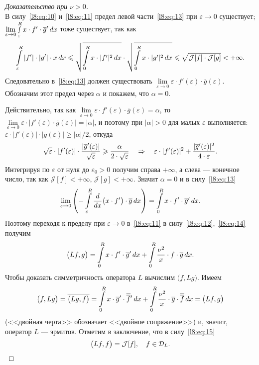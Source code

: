 \documentclass[12pt,a4paper,openany,fleqn]{book}
\newcommand{\J}{\ensuremath{\mathcal{J}}}
\newcommand{\mc}[1]{\ensuremath{\mathcal{#1}}}
\newcommand{\der}[2]{\ensuremath{\frac{d#1}{d#2}}}
\newcommand{\eps}{\varepsilon}
\theoremstyle{definition}
\begin{document}
\begin{proof}[Доказательство при $\nu>0$]
\begin{equation}
		\end{equation}
		В силу~\eqref{l8:eq:10} и~\eqref{l8:eq:11} предел левой части~\eqref{l8:eq:13} при $\eps\to0$ существует; $\lim\limits_{\eps\to0}\smallint\limits_{\eps}^R x\cdot f'\cdot\overline{g}'\,dx$ тоже существует, так как 
		\begin{equation*}
			\hfill\int\limits_{\eps}^{R}|f'|\cdot|g'|\cdot x\,dx\leqslant\sqrt{\int\limits_{0}^{R}x\cdot|f'|^2\,dx}\cdot\sqrt{\int\limits_{0}^{R}x\cdot|g'|^2\,dx}\leqslant\sqrt{\J[f]\cdot\J[g]}<+\infty.\hfill
		\end{equation*}
		Следовательно в~\eqref{l8:eq:13} должен существовать $\lim\limits_{\eps\to0}\eps\cdot f'(\eps)\cdot\overline{g}(\eps)$. Обозначим этот предел через $\alpha$ и покажем, что $\alpha=0$.
		
		Действительно, так как $\lim\limits_{\eps\to0}\eps\cdot f'(\eps)\cdot\overline{g}(\eps)=\alpha$, то $\lim\limits_{\eps\to0}\eps\cdot |f'(\eps)\cdot\overline{g}(\eps)|=|\alpha|$, и поэтому при $|\alpha|>0$ для малых $\eps$ выполняется: $\eps\cdot|f'(\eps)|\cdot|\overline{g}(\eps)|\geqslant|\alpha|/2$, откуда 
		\begin{equation*}
			\hfill\sqrt{\eps}\cdot|f'(\eps)|\cdot\frac{|\overline{g}'(\eps)|}{\sqrt{\eps}}\geqslant\frac{\alpha}{2\cdot\sqrt{\eps}}\quad\Rightarrow\quad\eps\cdot|f'(\eps)|^2+\frac{|\overline{g}'(\eps)|^2}{4\cdot\eps}.\hfill
		\end{equation*}
		Интегрируя по $\eps$ от нуля до $\eps_0>0$ получим справа $+\infty$, а слева --- конечное число, так как $\J[f]<+\infty$, $\J[g]<+\infty$. Значит $\alpha=0$ и в силу~\eqref{l8:eq:13} 
		\begin{equation}\label{l8:eq:14}
			\hfill\lim\limits_{\eps\to0}\left(-\int\limits_{\eps}^R\der{}{x}\big(x\cdot f'\big)\cdot\overline{g}\,dx\right)=\int\limits_{0}^{R}x\cdot f'\cdot\overline{g}'\,dx.\hfill
		\end{equation}
		Поэтому переходя к пределу при $\eps\to0$ в~\eqref{l8:eq:11} в силу~\eqref{l8:eq:12},~\eqref{l8:eq:14} получим
		\begin{equation}\label{l8:eq:15}
			\hfill\big(Lf,g\big)=\int\limits_0^R x\cdot f'\cdot\overline{g}'\,dx+\int\limits_{0}^{R}\frac{\nu^2}{x}\cdot f\cdot\overline{g}\,dx.\hfill
		\end{equation}
		Чтобы доказать симметричность оператора $L$ вычислим $\big(f,Lg\big)$. Имеем
		\begin{equation*}
			\hfill\big(f,Lg\big)=\overline{\big(Lg,f\big)}=\int\limits_0^R x\cdot \overline{g}'\cdot\overline{\overline{f}}\vphantom{f}'\,dx+\int\limits_{0}^{R}\frac{\nu^2}{x}\cdot \overline{g}\cdot\overline{\overline{f}}\,dx=\big(Lf,g\big)\hfill
		\end{equation*}
		(<<двойная черта>> обозначает <<двойное сопряжение>>) и, значит, оператор $L$ --- эрмитов. Отметим в заключение, что в силу~\eqref{l8:eq:15} 
		\begin{equation*}
			\hfill\big(Lf,f\big)=\J[f],\quad f\in\mc{D}_L.\hfill
		\end{equation*} 
	\end{proof}
	
\end{document}
